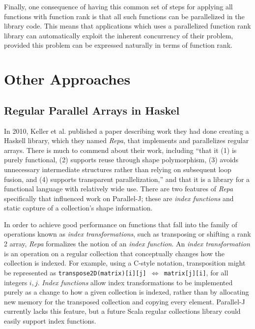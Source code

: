 Finally, one consequence of having this common set of steps for applying all functions with function rank is
that all such functions can be parallelized in the library code.
This means that applications which uses a parallelized function rank library 
can automatically exploit the inherent concurrency of their problem, 
provided this problem can be expressed naturally in terms of function rank.

\section{Other Approaches}
\subsection{Regular Parallel Arrays in Haskel}
\label{repa}
In 2010, Keller et al. published a paper\cite{dph} 
describing work they had done creating a Haskell library, which they named \textit{Repa}, that implements and parallelizes regular arrays.
There is much to commend about their work, including ``that it (1) is purely
functional, (2) supports reuse through shape polymorphism, (3)
avoids unnecessary intermediate structures rather than relying on
subsequent loop fusion, and (4) supports transparent parallelization,''
and that it is a library for a functional language with relatively wide use. 
There are two features of \textit{Repa} specifically 
that influenced work on Parallel-J; 
these are \textit{index functions} and static capture of a collection's shape information.

In order to achieve good performance on functions 
that fall into the family of operations known as \textit{index transformations}, 
such as transposing or shifting a rank 2 array, 
\textit{Repa} formalizes the notion of an \textit{index function}. 
An \textit{index transformation} is an operation on a regular collection that 
conceptually changes how the collection is indexed. 
For example, using a C-style notation, transposition might be represented as 
\texttt{transpose2D(matrix)[i][j] $\Leftrightarrow$ matrix[j][i]}, for all integers $i,j$. 
\textit{Index functions} allow index transformations to be implemented purely as 
a change to how a given collection is indexed, 
rather than by allocating new memory for the transposed collection and copying every element. 
Parallel-J currently lacks this feature, 
but a future Scala regular collections library could easily support index functions.

